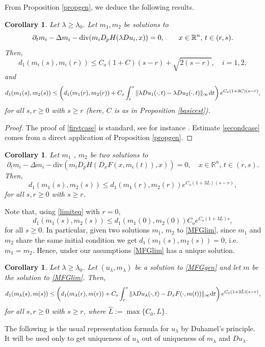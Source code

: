 \documentclass{amsart}
\newtheorem{cor}[thm]{Corollary}
\theoremstyle{remark}
\theoremstyle{definition}
\theoremstyle{Claim}
\newcommand{\dd}{\hspace{0.7pt}{\rm d}}
\theoremstyle{plain}
\begin{document}
From Proposition \ref{propgen}, we deduce the following results.
\begin{cor}\label{stimad1}
		Let $\lambda\ge \lambda_0$. Let $m_1,m_2$ be solutions to 
		\[
			\partial_t m_i-\Delta m_i-{\rm div}(m_iD_pH(\lambda Du_i,x))=0,\qquad x\in \mathbb{R}^n,\,t\in (r,s).\\
		\]
	 Then, 
		 \begin{equation}\label{firstcase}
d_1(m_i(s), m_i(r))\le C_o(1+C)(s-r) + \sqrt{2(s-r)},\quad i=1,2,
		\end{equation}
		 and
		\begin{equation}\label{secondcase}
d_1(m_1(s), m_2(s))\le \left(d_1(m_1(r), m_2(r)) +  C_o \int_r^s  \| \lambda D u_1(\cdot,t) - \lambda D u_2(\cdot,t) \|_\infty \dd t\right)e^{ C_o(1+3C)(s-r)},
		\end{equation}
		for all $s,r\geq 0$ with  $s\geq r$ (here, $C$ is as in Proposition \ref{basicest}).
		
		
	\end{cor}

\begin{proof} The proof of \eqref{firstcase} is standard, see for instance \cite[Lemma 6]{CP}. Estimate \eqref{secondcase} comes from a direct application of Proposition \ref{propgen}.
\end{proof}
	\begin{cor}\label{uniqm}
		Let $m_1$ , $m_2$ be two solutions to 
		$$\partial_t m_i-\Delta m_i-\text{div}(m_iD_pH(D_x F(x,m_i(t)),x))=0,\quad x\in \mathbb{R}^n,\,t\in (r,s).$$
		Then,
		\begin{equation}\label{limiteq}
			d_1(m_1(s), m_2(s))\le d_1(m_1(r), m_2(r)) e^{ C_o(1+3L)(s-r)},
		\end{equation}
		for all $s,r\geq 0$ with  $s\geq r$.
\end{cor}
Note that, using \eqref{limiteq} with $r=0$, 
$$d_1(m_1(s), m_2(s))\le d_1(m_1(0), m_2(0))  C_o e^{ C_o (1+3L)s},$$
for all $s\geq 0$. In particular, given two solutions $m_1$, $m_2$ to \eqref{MFGlim}, since $m_1$ and $m_2$ share the same initial condition we get $d_1(m_1(s), m_2(s))=0$, i.e. $m_1=m_2$. Hence, under our assumptions \eqref{MFGlim} has a unique solution.	

\begin{cor}\label{estmlambdam}
Let $\lambda\ge \lambda_0$. Let $(u_\lambda,m_\lambda)$ be a solution to \eqref{MFGgen} and let $m$ be the solution to \eqref{MFGlim}. Then,
\begin{equation}\label{mlambdam}
	d_1(m_\lambda(s), m(s))\le \left(d_1(m_\lambda(r), m(r)) +  C_o \int_r^s  \| \lambda D u_\lambda(\cdot,t) - D_xF(\cdot,m(t)) \|_\infty \dd t\right)e^{ C_o (1+3\hat{L})(s-r)},
\end{equation}
for all $s,r\geq 0$ with  $s\geq r$, where $\hat{L}:=\max\{C_0,L\}$.


\end{cor}
The following is the usual representation formula for $u_\lambda$ by Duhamel's principle. It will be used only to get uniqueness of $u_\lambda$ out of uniqueness of $m_\lambda$ and $Du_\lambda$.
\end{document}
